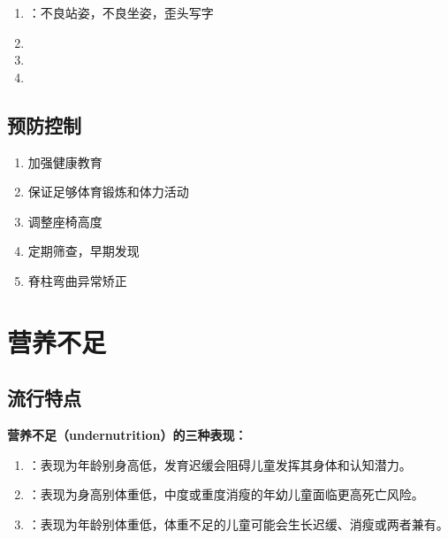 \begin{keybox}
\begin{enumerate}[leftmargin=*]
    \item {}：不良站姿，不良坐姿，歪头写字
    \item {}
    \item {}
    \item {}
\end{enumerate}
\end{keybox}

\subsection{预防控制}

\begin{keybox}
\begin{enumerate}[leftmargin=*]
    \item 加强健康教育
    \item 保证足够体育锻炼和体力活动
    \item 调整座椅高度
    \item 定期筛查，早期发现
    \item 脊柱弯曲异常矫正
\end{enumerate}
\end{keybox}

\section{营养不足}

\subsection{流行特点}

\begin{defbox}
\textbf{营养不足（undernutrition）的三种表现：}

\begin{enumerate}[leftmargin=*]
    \item {}：表现为年龄别身高低，发育迟缓会阻碍儿童发挥其身体和认知潜力。
    \item {}：表现为身高别体重低，中度或重度消瘦的年幼儿童面临更高死亡风险。
    \item {}：表现为年龄别体重低，体重不足的儿童可能会生长迟缓、消瘦或两者兼有。
\end{enumerate}
\end{defbox}

